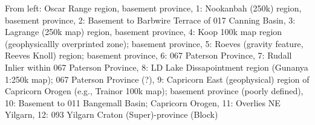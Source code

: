 From left: Oscar Range region, basement province, 1: Nookanbah (250k) region, basement province, 2: Basement to Barbwire Terrace of 017 Canning Basin, 3: Lagrange (250k map) region, basement province, 4: Koop 100k map region (geophysicallly overprinted zone); basement province, 5: Roeves (gravity feature, Reeves Knoll) region; basement province, 6: 067 Paterson Province, 7: Rudall Inlier within  067 Paterson Province, 8: LD Lake Dissapointment  region (Gunanya 1:250k map); 067 Paterson Province (?), 9: Capricorn East (geophysical) region of Capricorn Orogen (e.g., Trainor 100k map); basement province (poorly defined), 10: Basement to 011 Bangemall Basin; Capricorn Orogen, 11: Overlies NE Yilgarn, 12: 093 Yilgarn Craton (Super)-province (Block)
